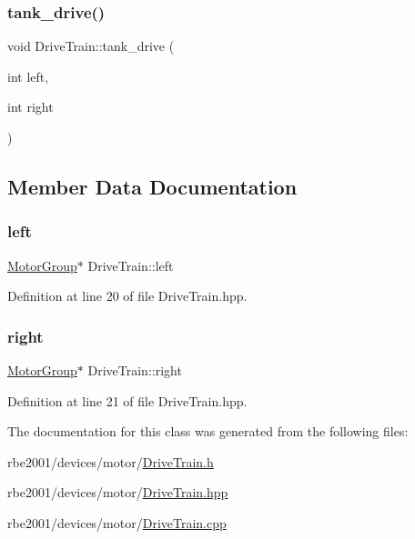 \subsubsection{\texorpdfstring{tank\+\_\+drive()}{tank\_drive()}\hspace{0.1cm}{\footnotesize\ttfamily [4/4]}}
{\footnotesize\ttfamily void Drive\+Train\+::tank\+\_\+drive (\begin{DoxyParamCaption}\item[{int}]{left,  }\item[{int}]{right }\end{DoxyParamCaption})}



\subsection{Member Data Documentation}
\mbox{\label{class_drive_train_a8343c1e4fad9e5c7e68e627f592e52ea}} 
\subsubsection{\texorpdfstring{left}{left}}
{\footnotesize\ttfamily \hyperlink{class_motor_group}{Motor\+Group}$\ast$ Drive\+Train\+::left\hspace{0.3cm}{\ttfamily [protected]}}



Definition at line 20 of file Drive\+Train.\+hpp.

\mbox{\label{class_drive_train_a1fe3a54242798b1b88eb437c7c7cf9ad}} 
\subsubsection{\texorpdfstring{right}{right}}
{\footnotesize\ttfamily \hyperlink{class_motor_group}{Motor\+Group}$\ast$ Drive\+Train\+::right\hspace{0.3cm}{\ttfamily [protected]}}



Definition at line 21 of file Drive\+Train.\+hpp.



The documentation for this class was generated from the following files\+:\begin{DoxyCompactItemize}
\item 
rbe2001/devices/motor/\hyperlink{_drive_train_8h}{Drive\+Train.\+h}\item 
rbe2001/devices/motor/\hyperlink{devices_2motor_2_drive_train_8hpp}{Drive\+Train.\+hpp}\item 
rbe2001/devices/motor/\hyperlink{devices_2motor_2_drive_train_8cpp}{Drive\+Train.\+cpp}\end{DoxyCompactItemize}
